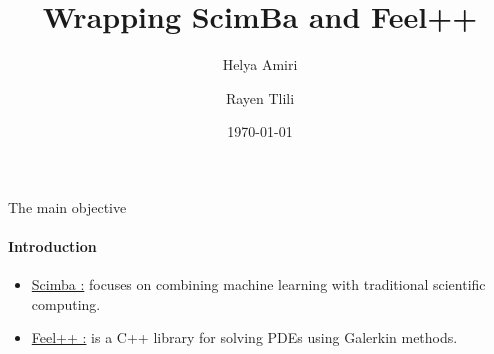 \documentclass{beamer}
\title{Wrapping ScimBa and Feel++}
\author{Helya Amiri \and Rayen Tlili}
\date{\today}
\newcommand{\hrefcol}[2]{\textcolor{cyan}{\href{#1}{#2}}}
\begin{document}
\maketitle

\begin{comment}

Our goal is to streamline data exchange and empower users to leverage the combined strengths of ScimBa and Feel++ effectively.
\end{comment}

\begin{frame}[plain]
\begin{center}
\end{center}

\end{frame}
\begin{frame}{The main objective}
\framesubtitle{Introduction}

\begin{itemize}
    \item  \hrefcol{https://sciml.gitlabpages.inria.fr/scimba/}{Scimba :} focuses on combining machine learning with traditional scientific computing. 
    \item  \hrefcol{https://docs.feelpp.org/user/latest/index.html}{Feel++ :} is a C++ library for solving PDEs using Galerkin methods. 
\end{itemize}    

\end{frame}

\begin{comment}
We will visualize and compare the results of both solvers in terms of efficiency and accuracy.

After successfully solving Poisson equations, we will extend the program's application to solve other types of PDEs.
\end{comment}
\end{document}
